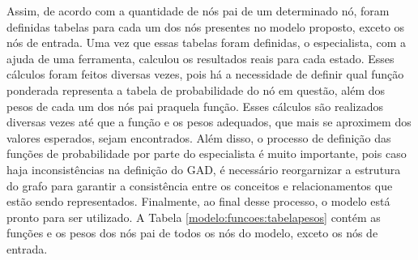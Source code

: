 \begin{table}[ht!]
\centering
\caption{Tabela para definição das Funções de Probabilidade de nós com três pais}
\label{modelo:funcoes:tabela3nos}
\end{table}

Assim, de acordo com a quantidade de nós pai de um determinado nó, foram definidas tabelas para cada um dos nós presentes no modelo proposto, exceto os nós de entrada. Uma vez que essas tabelas foram definidas, o especialista, com a ajuda de uma ferramenta, calculou os resultados reais para cada estado. Esses cálculos foram feitos diversas vezes, pois há a necessidade de definir qual função ponderada representa a tabela de probabilidade do nó em questão, além dos pesos de cada um dos nós pai praquela função. Esses cálculos são realizados diversas vezes até que a função e os pesos adequados, que mais se aproximem dos valores esperados, sejam encontrados. Além disso, o processo de definição das funções de probabilidade por parte do especialista é muito importante, pois caso haja inconsistências na definição do GAD, é necessário reorgarnizar a estrutura do grafo para garantir a consistência entre os conceitos e relacionamentos que estão sendo representados. Finalmente, ao final desse processo, o modelo está pronto para ser utilizado. A Tabela \ref{modelo:funcoes:tabelapesos} contém as funções e os pesos dos nós pai de todos os nós do modelo, exceto os nós de entrada.

